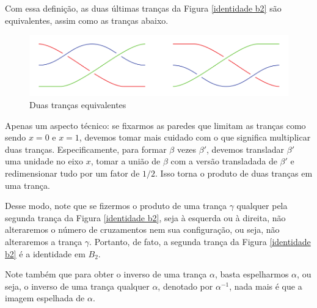 \documentclass[a4paper,portuguese,11pt,twoside, leqno]{book}
\theoremstyle{definition}
\newtheorem{exercise}{Exercício}[section]
\begin{document}
	\par\vspace{0.3cm} Com essa definição, as duas últimas tranças da Figura \eqref{identidade b2} são equivalentes, assim como as tranças abaixo.
	
	\begin{figure}[H]
		\captionsetup{justification=centering}
		\begin{center}
			\includegraphics[width=12cm]{Images/fig_18_6.png}
		\end{center}\caption{Duas tranças equivalentes}\label{trancas equivalentes}
	\end{figure}   
	
	\par\vspace{0.3cm} Apenas um aspecto técnico: se fixarmos as paredes que limitam as tranças como sendo $x = 0$ e $x=1$, devemos tomar mais cuidado com o que significa multiplicar duas tranças. Especificamente, para formar $\beta$ vezes $\beta'$, devemos transladar $\beta'$ uma unidade no eixo $x$, tomar a união de $\beta$ com a versão transladada de $\beta'$ e redimensionar tudo por um fator de $1/2$. Isso torna o produto de duas tranças em uma trança.
	
	\par\vspace{0.3cm} Desse modo, note que se fizermos o produto de uma trança $\gamma$ qualquer pela segunda trança da Figura \eqref{identidade b2}, seja à esquerda ou à direita, não alteraremos o número de cruzamentos nem sua configuração, ou seja, não alteraremos a trança $\gamma$. Portanto, de fato, a segunda trança da Figura \eqref{identidade b2} é a identidade em $B_2$.
	
	\par\vspace{0.3cm} Note também que para obter o inverso de uma trança $\alpha$, basta espelharmos $\alpha$, ou seja, o inverso de uma trança qualquer $\alpha$, denotado por $\alpha^{-1}$, nada mais é que a imagem espelhada de $\alpha$.   
	
	
	
\end{document}
